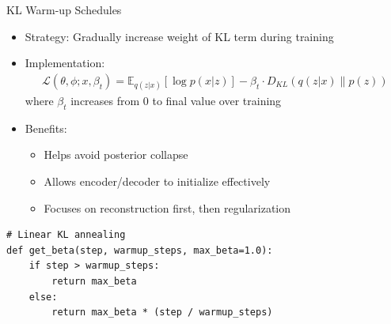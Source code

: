 \documentclass[5pt,aspectratio=169]{beamer}
\begin{document}
\begin{frame}{KL Warm-up Schedules}
\begin{itemize}
\item Strategy: Gradually increase weight of KL term during training
\item Implementation:
\begin{align}
\mathcal{L}(\theta, \phi; x, \beta_t) = \mathbb{E}_{q(z|x)}[\log p(x|z)] - \beta_t \cdot D_{KL}(q(z|x) \| p(z))
\end{align}
where $\beta_t$ increases from 0 to final value over training
\item Benefits:
  \begin{itemize}
  \item Helps avoid posterior collapse
  \item Allows encoder/decoder to initialize effectively
  \item Focuses on reconstruction first, then regularization
  \end{itemize}
\end{itemize}

\end{frame}

\begin{frame}[fragile]


\begin{center}

\begin{lstlisting}
# Linear KL annealing
def get_beta(step, warmup_steps, max_beta=1.0):
    if step > warmup_steps:
        return max_beta
    else:
        return max_beta * (step / warmup_steps)
\end{lstlisting}
\end{center}  
\end{frame}
\end{document}
